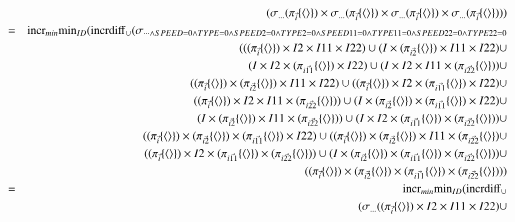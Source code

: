 \begin{eqnarray*}
&&(\sigma_{\dots}( \pi_{\vec{i}} \{\tuple{} \} ) \times   \sigma_{\dots}( \pi_{\vec{i}} \{\tuple{} \} ) \times  \sigma_{\dots}( \pi_{\vec{i}} \{\tuple{} \} ) \times  \sigma_{\dots}( \pi_{\vec{i}} \{\tuple{} \} ))) \\
%
&=& \algincr_{min} \algmin_{ID} (\algincrdiff_{\cup} (\sigma_{ \dots \wedge SPEED = 0 \wedge TYPE = 0 \wedge SPEED2 = 0 \wedge TYPE2 = 0 \wedge SPEED11 = 0 \wedge TYPE11 = 0 \wedge SPEED22 = 0 \wedge TYPE22 =0  } \\ &&(
(( \pi_{\vec{i}} \{\tuple{} \} ) \times I2 \times I11 \times I22) \cup 
(I \times ( \pi_{\vec{i2}} \{\tuple{} \} ) \times I11 \times I22) \cup \\
&&(I \times  I2 \times  ( \pi_{\vec{i11}} \{\tuple{} \}) \times I22) \cup 
(I \times I2 \times I11 \times  ( \pi_{\vec{i22}} \{\tuple{} \} )) \cup \\
&&(( \pi_{\vec{i}} \{\tuple{} \} ) \times  ( \pi_{\vec{i2}} \{\tuple{} \} ) \times I11 \times I22) \cup 
(( \pi_{\vec{i}} \{\tuple{} \} ) \times I2 \times ( \pi_{\vec{i11}} \{\tuple{} \} ) \times I22) \cup \\
&&(( \pi_{\vec{i}} \{\tuple{} \} ) \times I2 \times I11 \times ( \pi_{\vec{i22}} \{\tuple{} \} )) \cup 
(I \times  ( \pi_{\vec{i2}} \{\tuple{} \} ) \times  ( \pi_{\vec{i11}} \{\tuple{} \} ) \times I22) \cup \\
&&(I \times  ( \pi_{\vec{i2}} \{\tuple{} \} ) \times I11 \times ( \pi_{\vec{i22}} \{\tuple{} \} )) \cup 
(I \times I2 \times ( \pi_{\vec{i11}} \{\tuple{} \} ) \times ( \pi_{\vec{i22}} \{\tuple{} \} )) \cup \\
&&(( \pi_{\vec{i}} \{\tuple{} \} ) \times ( \pi_{\vec{i2}} \{\tuple{} \} ) \times ( \pi_{\vec{i11}} \{\tuple{} \} ) \times I22) \cup 
(( \pi_{\vec{i}} \{\tuple{} \} ) \times ( \pi_{\vec{i2}} \{\tuple{} \} ) \times I11 \times (\pi_{\vec{i22}} \{\tuple{}\}) \cup \\
&&(( \pi_{\vec{i}} \{\tuple{} \} ) \times I2 \times  ( \pi_{\vec{i11}} \{\tuple{} \} ) \times ( \pi_{\vec{i22}} \{\tuple{} \} )) \cup 
(I \times ( \pi_{\vec{i2}} \{\tuple{} \} ) \times ( \pi_{\vec{i11}} \{\tuple{} \} ) \times ( \pi_{\vec{i22}} \{\tuple{} \} )) \cup \\
&&(( \pi_{\vec{i}} \{\tuple{} \} ) \times ( \pi_{\vec{i2}} \{\tuple{} \} ) \times ( \pi_{\vec{i11}} \{\tuple{} \} ) \times ( \pi_{\vec{i22}} \{\tuple{} \} ))) \\
%
&=& \algincr_{min} \algmin_{ID} (\algincrdiff_{\cup} \\
&& (\sigma_{ \dots}(( \pi_{\vec{i}} \{\tuple{} \} ) \times I2 \times I11 \times I22) \cup 

\end{eqnarray*}

